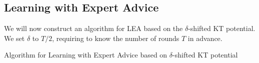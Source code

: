 \subsection{Learning with Expert Advice}
\label{section:kt-lea}

We will now construct an algorithm for \ac{LEA} based on the $\delta$-shifted KT
potential. We set $\delta$ to $T/2$, requiring to know
the number of rounds $T$ in advance.

\begin{algorithm}[t]
\begin{algorithmic}[1]
\caption{Algorithm for Learning with Expert Advice based on $\delta$-shifted KT potential
\label{algorithm:kt-experts}}
{
\ENDFOR
}
\end{algorithmic}
\end{algorithm}


